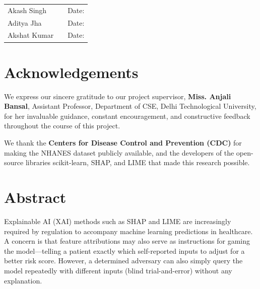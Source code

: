 \documentclass[12pt, a4paper, oneside]{report}
\theoremstyle{definition}
\begin{document}
\vspace{2cm}
\noindent
\begin{tabular}{lll}
  Akash Singh  & \underline{\hspace{4cm}} & Date: \underline{\hspace{2.5cm}} \\[0.8cm]
  Aditya Jha   & \underline{\hspace{4cm}} & Date: \underline{\hspace{2.5cm}} \\[0.8cm]
  Akshat Kumar & \underline{\hspace{4cm}} & Date: \underline{\hspace{2.5cm}} \\
\end{tabular}

\chapter*{Acknowledgements}

We express our sincere gratitude to our project supervisor,
\textbf{Miss. Anjali Bansal}, Assistant Professor, Department of CSE,
Delhi Technological University, for her invaluable guidance, constant
encouragement, and constructive feedback throughout the course of this
project.

We thank the \textbf{Centers for Disease Control and Prevention (CDC)}
for making the NHANES dataset publicly available, and the developers of
the open-source libraries scikit-learn, SHAP, and LIME that made this
research possible.

\chapter*{Abstract}

Explainable AI (XAI) methods such as SHAP and LIME are increasingly
required by regulation to accompany machine learning predictions in
healthcare. A concern is that feature attributions may also serve as
instructions for gaming the model---telling a patient exactly which
self-reported inputs to adjust for a better risk score. However, a
determined adversary can also simply query the model repeatedly with
different inputs (blind trial-and-error) without any explanation.
\end{document}
